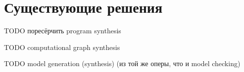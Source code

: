 \section{Существующие решения}

TODO поресёрчить program synthesis

TODO computational graph synthesis

TODO model generation (synthesis) (из той же оперы, что и model checking)
